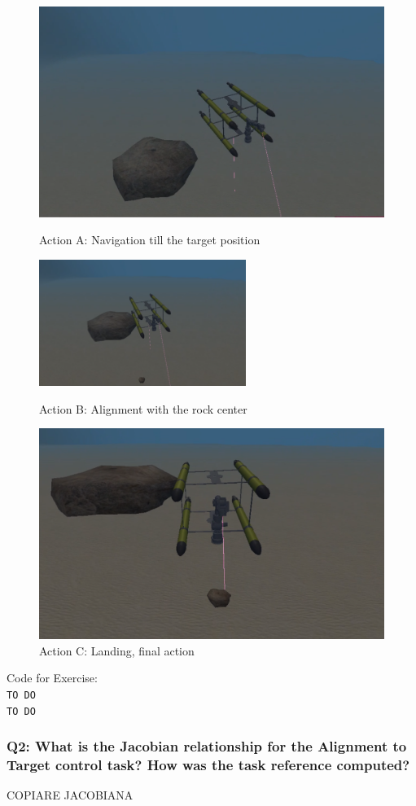 \documentclass{article}
\begin{document}
\begin{figure}[htp]
\centering
\includegraphics[width=.6\textwidth]{312_Nav.png}\caption{Action A: Navigation till the target position}
\centering
\includegraphics[width=0.6\textwidth]{312_Alr.png}\caption{Action B: Alignment with the rock center}
\centering
\includegraphics[width=.6\textwidth]{312_Land.png}\caption{Action C: Landing, final action}
\label{fig:missionphase3}
\end{figure}

\colorbox{mygray}{\parbox{0.9\textwidth}{Code for Exercise: \\
\texttt{TO DO}\\
\texttt{TO DO}
}}

\subsubsection{Q2: What is the Jacobian relationship for the Alignment to Target control task? How was the task reference computed?}
COPIARE JACOBIANA
\end{document}
